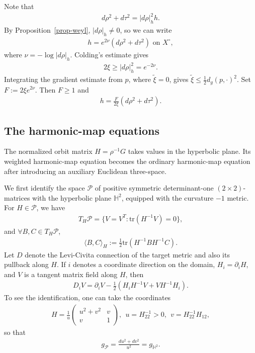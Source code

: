 \documentclass[letterpaper]{amsart}
\theoremstyle{definition}
\theoremstyle{remark}
\begin{document}
Note that
\begin{align*}
	d \rho ^2+ d \tau ^2 = |d \rho |^2_{h} h.
\end{align*} 
By Proposition~\ref{prop-weyl}, $|d \rho |_h \neq 0$, so we can write
\begin{align*}
	h = e ^{ 2 \nu } (d \rho ^2+ d \tau ^2) \text{ on } X ^{\circ},
\end{align*} 
where $\nu = - \log |d \rho |_{h}$. Colding's estimate gives
\begin{align*}
	2 \xi \geq |d \rho |^2_h = e ^{-2 \nu }.
\end{align*} 
Integrating the gradient estimate from $p$, where $\tilde\xi=0$, gives $\tilde{\xi } \leq \frac{1}{2} d_{g}(p,\cdot ) ^2$. Set $F:=2 \xi e ^{2 \nu } $.  Then $F \geq 1$ and
\begin{align*}
	h = \frac{F}{2 \xi } (d \rho ^2+ d \tau ^2).
\end{align*} 

\subsection{The harmonic-map equations}\label{subsec-harmonic-map}
The normalized orbit matrix $H=\rho^{-1}G$ takes values in the hyperbolic
plane. Its weighted harmonic-map equation becomes the ordinary harmonic-map
equation after introducing an auxiliary Euclidean three-space.

We first identify the space $\mathcal{P}$ of positive symmetric determinant-one $(2 \times 2)$-matrices with the hyperbolic plane $\mathbb{H}^2$, equipped with the curvature $-1$ metric. For $H \in \mathcal{P}$, we have
\begin{align*}
	T_{H} \mathcal{P} = \{V = V ^{T}: \mathrm{tr}(H ^{-1} V) =0\} ,
\end{align*} 
and $\forall B, C \in T_{H} \mathcal{P}$,
\begin{align*}
	\langle B, C \rangle_{H} := \frac{1}{2} \mathrm{tr}\left( H ^{-1} B H ^{-1} C \right) .
\end{align*}  
Let $D$ denote the Levi-Civita connection of the target metric and also its pullback along $H$. If $i$ denotes a coordinate direction on the domain, $H_i=\partial_iH$, and $V$ is a tangent matrix field along $H$, then
\begin{align*}
	D_{i} V = \partial _i V - \frac{1}{2} (H_i H ^{-1} V + V H ^{-1} H_i).
\end{align*} 
To see the identification, one can take the coordinates
\begin{align*}
	H = \frac{1}{u} \begin{pmatrix} u ^2 + v ^2 & v \\ v & 1 \end{pmatrix} ,\ \ u = H_{22}^{-1} >0, \ \ v= H_{22} ^{-1} H_{12},
\end{align*} 
so that
\begin{align*}
	g_{\mathcal{P}} = \frac{d u^2 + d v ^2}{ u ^2} = g_{\mathbb{H}^2}.
\end{align*} 
\end{document}

